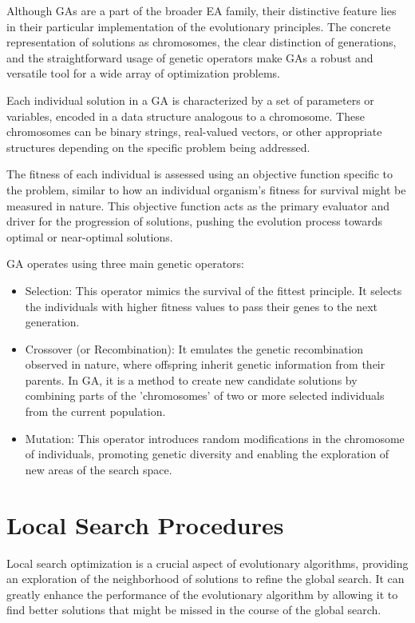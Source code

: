 \documentclass[twoside]{ctuthesis}
\theoremstyle{plain}
\theoremstyle{definition}
\theoremstyle{note}
\begin{document}
Although GAs are a part of the broader EA family, their distinctive feature lies in their particular implementation of the evolutionary principles. The concrete representation of solutions as chromosomes, the clear distinction of generations, and the straightforward usage of genetic operators make GAs a robust and versatile tool for a wide array of optimization problems.

Each individual solution in a GA is characterized by a set of parameters or variables, encoded in a data structure analogous to a chromosome. These chromosomes can be binary strings, real-valued vectors, or other appropriate structures depending on the specific problem being addressed.

The fitness of each individual is assessed using an objective function specific to the problem, similar to how an individual organism's fitness for survival might be measured in nature. This objective function acts as the primary evaluator and driver for the progression of solutions, pushing the evolution process towards optimal or near-optimal solutions.

GA operates using three main genetic operators:
\begin{itemize}
	\item Selection: This operator mimics the survival of the fittest principle. It selects the individuals with higher fitness values to pass their genes to the next generation.
	\item Crossover (or Recombination): It emulates the genetic recombination observed in nature, where offspring inherit genetic information from their parents. In GA, it is a method to create new candidate solutions by combining parts of the 'chromosomes' of two or more selected individuals from the current population.
	\item Mutation: This operator introduces random modifications in the chromosome of individuals, promoting genetic diversity and enabling the exploration of new areas of the search space.
\end{itemize}

\section{Local Search Procedures}
\label{sec:localsearch}
Local search optimization is a crucial aspect of evolutionary algorithms, providing an exploration of the neighborhood of solutions to refine the global search. It can greatly enhance the performance of the evolutionary algorithm by allowing it to find better solutions that might be missed in the course of the global search. \cite{burke2014search}
\end{document}
